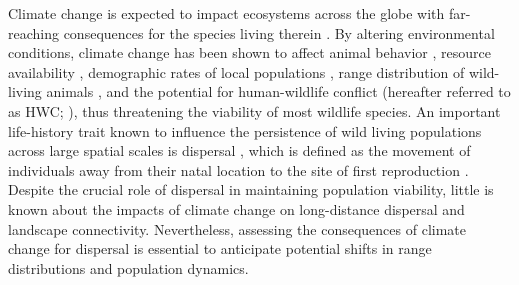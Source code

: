 \documentclass[../FinalThesis.tex]{subfiles}
\begin{document}
Climate change is expected to impact ecosystems across the globe with
far-reaching consequences for the species living therein \citep{Paniw.2019,
Radchuk.2019, IPCC.2022, Ozgul.2023}. By altering environmental conditions,
climate change has been shown to affect animal behavior \citep{Fuller.2016},
resource availability \citep{Durant.2007}, demographic rates of local
populations \citep{Paniw.2021}, range distribution of wild-living animals
\citep{Thomas.2004, Thuiller.2006}, and the potential for human-wildlife
conflict (hereafter referred to as HWC; \citealp{Abrahms.2023}), thus
threatening the viability of most wildlife species. An important life-history
trait known to influence the persistence of wild living populations across large
spatial scales is dispersal \citep{Hanski.1999, Bowler.2005, Kokko.2006}, which
is defined as the movement of individuals away from their natal location to the
site of first reproduction \citep{Clobert.2012}. Despite the crucial role of
dispersal in maintaining population viability, little is known about the impacts
of climate change on long-distance dispersal and landscape connectivity.
Nevertheless, assessing the consequences of climate change for dispersal is
essential to anticipate potential shifts in range distributions and population
dynamics.
\end{document}
